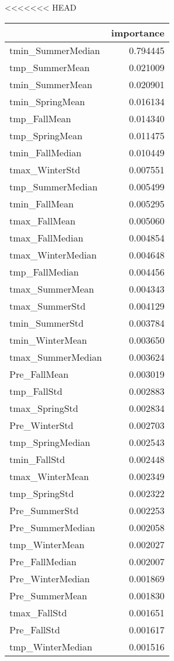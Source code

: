 <<<<<<< HEAD
\begin{tabular}{lr}
\toprule
 & importance \\
\midrule
tmin_SummerMedian & 0.794445 \\
tmp_SummerMean & 0.021009 \\
tmin_SummerMean & 0.020901 \\
tmin_SpringMean & 0.016134 \\
tmp_FallMean & 0.014340 \\
tmp_SpringMean & 0.011475 \\
tmin_FallMedian & 0.010449 \\
tmax_WinterStd & 0.007551 \\
tmp_SummerMedian & 0.005499 \\
tmin_FallMean & 0.005295 \\
tmax_FallMean & 0.005060 \\
tmax_FallMedian & 0.004854 \\
tmax_WinterMedian & 0.004648 \\
tmp_FallMedian & 0.004456 \\
tmax_SummerMean & 0.004343 \\
tmax_SummerStd & 0.004129 \\
tmin_SummerStd & 0.003784 \\
tmin_WinterMean & 0.003650 \\
tmax_SummerMedian & 0.003624 \\
Pre_FallMean & 0.003019 \\
tmp_FallStd & 0.002883 \\
tmax_SpringStd & 0.002834 \\
Pre_WinterStd & 0.002703 \\
tmp_SpringMedian & 0.002543 \\
tmin_FallStd & 0.002448 \\
tmax_WinterMean & 0.002349 \\
tmp_SpringStd & 0.002322 \\
Pre_SummerStd & 0.002253 \\
Pre_SummerMedian & 0.002058 \\
tmp_WinterMean & 0.002027 \\
Pre_FallMedian & 0.002007 \\
Pre_WinterMedian & 0.001869 \\
Pre_SummerMean & 0.001830 \\
tmax_FallStd & 0.001651 \\
Pre_FallStd & 0.001617 \\
tmp_WinterMedian & 0.001516 \\

\end{tabular}

